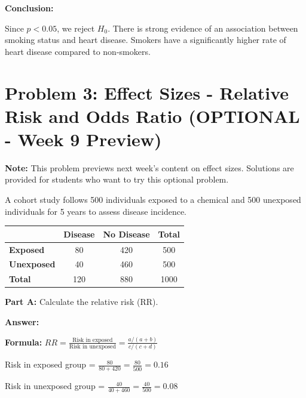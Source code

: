 \documentclass[11pt]{article}
\begin{document}
\textbf{Conclusion:}

Since $p < 0.05$, we reject $H_0$. There is strong evidence of an association between smoking status and heart disease. Smokers have a significantly higher rate of heart disease compared to non-smokers.

\newpage

\section{Problem 3: Effect Sizes - Relative Risk and Odds Ratio (OPTIONAL - Week 9 Preview)}

\textbf{Note:} This problem previews next week's content on effect sizes. Solutions are provided for students who want to try this optional problem.

\vspace{0.3cm}

A cohort study follows 500 individuals exposed to a chemical and 500 unexposed individuals for 5 years to assess disease incidence.

\begin{center}
\begin{tabular}{l|cc|c}
& \textbf{Disease} & \textbf{No Disease} & \textbf{Total} \\
\hline
\textbf{Exposed} & 80 & 420 & 500 \\
\textbf{Unexposed} & 40 & 460 & 500 \\
\hline
\textbf{Total} & 120 & 880 & 1000 \\
\end{tabular}
\end{center}

\vspace{6pt}

\textbf{Part A:} Calculate the relative risk (RR).

\vspace{0.3cm}

\textbf{Answer:}

\textbf{Formula:} $RR = \frac{\text{Risk in exposed}}{\text{Risk in unexposed}} = \frac{a/(a+b)}{c/(c+d)}$

\vspace{0.3cm}

Risk in exposed group = $\frac{80}{80+420} = \frac{80}{500} = 0.16$

\vspace{0.3cm}

Risk in unexposed group = $\frac{40}{40+460} = \frac{40}{500} = 0.08$
\end{document}
